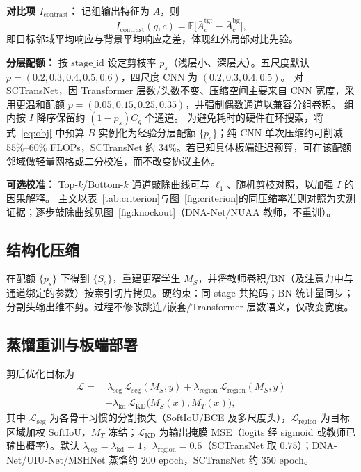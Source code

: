 \documentclass[lettersize,journal]{IEEEtran}
\begin{document}
\textbf{对比项 $I_{\mathrm{contrast}}$：}
记组输出特征为 $A$，则
\begin{equation}
\label{eq:contrast}
I_{\mathrm{contrast}}(g,c)=\mathbb{E}\!\big[\bar{A}_{c}^{\mathrm{tgt}}-\bar{A}_{c}^{\mathrm{bg}}\big],
\end{equation}
即目标邻域平均响应与背景平均响应之差，体现红外局部对比先验。

\textbf{分层配额：}
按 $\mathrm{stage\_id}$ 设定剪枝率 $p_s$（浅层小、深层大）。五尺度默认 $p=(0.2,0.3,0.4,0.5,0.6)$，四尺度 CNN 为 $(0.2,0.3,0.4,0.5)$。
对 SCTransNet，因 Transformer 层数/头数不变、压缩空间主要来自 CNN 宽度，采用更温和配额 $p=(0.05,0.15,0.25,0.35)$，并强制偶数通道以兼容分组卷积。
组内按 $I$ 降序保留约 $(1-p_s)C_g$ 个通道。
为避免耗时的硬件在环搜索，将式~\eqref{eq:obj} 中预算 $B$ 实例化为经验分层配额 $\{p_s\}$；纯 CNN 单次压缩约可削减 $55\%$--$60\%$ FLOPs，SCTransNet 约 $34\%$。若已知具体板端延迟预算，可在该配额邻域做轻量网格或二分校准，而不改变协议主体。

\textbf{可选校准：}
Top-$k$/Bottom-$k$ 通道敲除曲线可与 $\ell_1$、随机剪枝对照，以加强 $I$ 的因果解释。
主文以表~\ref{tab:criterion}与图~\ref{fig:criterion}的同压缩率准则对照为实测证据；逐步敲除曲线见图~\ref{fig:knockout}（DNA-Net/NUAA 教师，不重训）。

\subsection{结构化压缩}
\label{sec:prune}
在配额 $\{p_s\}$ 下得到 $\{S_s\}$，重建更窄学生 $M_S$，并将教师卷积/BN（及注意力中与通道绑定的参数）按索引切片拷贝。硬约束：同 stage 共掩码；BN 统计量同步；分割头输出维不剪。过程不修改跳连/嵌套/Transformer 层数语义，仅改变宽度。

\subsection{蒸馏重训与板端部署}
\label{sec:distill}
剪后优化目标为
\begin{equation}
\label{eq:loss}
\begin{aligned}
\mathcal{L}=&\ 
\lambda_{\mathrm{seg}}\,\mathcal{L}_{\mathrm{seg}}(M_S,y)
+\lambda_{\mathrm{region}}\,\mathcal{L}_{\mathrm{region}}(M_S,y)\\
&+\lambda_{\mathrm{kd}}\,\mathcal{L}_{\mathrm{KD}}\!\big(M_S(x),M_T(x)\big),
\end{aligned}
\end{equation}
其中 $\mathcal{L}_{\mathrm{seg}}$ 为各骨干习惯的分割损失（SoftIoU/BCE 及多尺度头），$\mathcal{L}_{\mathrm{region}}$ 为目标区域加权 SoftIoU，$M_T$ 冻结；$\mathcal{L}_{\mathrm{KD}}$ 为输出掩膜 MSE（logits 经 sigmoid 或教师已输出概率）。默认 $\lambda_{\mathrm{seg}}=\lambda_{\mathrm{kd}}=1$，$\lambda_{\mathrm{region}}=0.5$（SCTransNet 取 $0.75$）；DNA-Net/UIU-Net/MSHNet 蒸馏约 $200$ epoch，SCTransNet 约 $350$ epoch。
\end{document}
